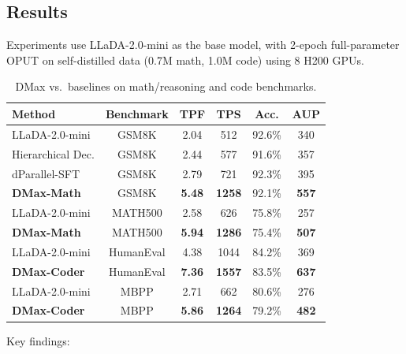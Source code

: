 \documentclass[11pt]{article}
\begin{document}
\subsection{Results}

Experiments use LLaDA-2.0-mini as the base model, with 2-epoch full-parameter OPUT on self-distilled data (0.7M math, 1.0M code) using 8 H200 GPUs.

\begin{table}[h]
\centering
\caption{DMax vs.\ baselines on math/reasoning and code benchmarks.}
\begin{tabular}{lccccc}
\toprule
\textbf{Method} & \textbf{Benchmark} & \textbf{TPF} & \textbf{TPS} & \textbf{Acc.} & \textbf{AUP} \\
\midrule
LLaDA-2.0-mini & GSM8K & 2.04 & 512 & 92.6\% & 340 \\
Hierarchical Dec. & GSM8K & 2.44 & 577 & 91.6\% & 357 \\
dParallel-SFT & GSM8K & 2.79 & 721 & 92.3\% & 395 \\
\textbf{DMax-Math} & GSM8K & \textbf{5.48} & \textbf{1258} & 92.1\% & \textbf{557} \\
\midrule
LLaDA-2.0-mini & MATH500 & 2.58 & 626 & 75.8\% & 257 \\
\textbf{DMax-Math} & MATH500 & \textbf{5.94} & \textbf{1286} & 75.4\% & \textbf{507} \\
\midrule
LLaDA-2.0-mini & HumanEval & 4.38 & 1044 & 84.2\% & 369 \\
\textbf{DMax-Coder} & HumanEval & \textbf{7.36} & \textbf{1557} & 83.5\% & \textbf{637} \\
\midrule
LLaDA-2.0-mini & MBPP & 2.71 & 662 & 80.6\% & 276 \\
\textbf{DMax-Coder} & MBPP & \textbf{5.86} & \textbf{1264} & 79.2\% & \textbf{482} \\
\bottomrule
\end{tabular}
\end{table}

Key findings:
\end{document}
